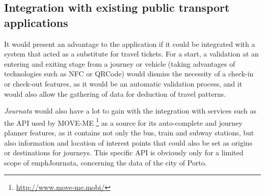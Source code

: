 \subsection{Integration with existing public transport applications}

It would present an advantage to the application if it could be integrated with a system that acted as a substitute for travel tickets. For a start, a validation at an entering and exiting stage from a journey or vehicle (taking advantages of technologies such as NFC or QRCode) would dismiss the necessity of a check-in or check-out features, as it would be an automatic validation process, and it would also allow the gathering of data for deduction of travel patterns.

\emph{Journata} would also have a lot to gain with the integration with services such as the API used by MOVE-ME \footnote{\url{http://www.move-me.mobi/}} as a source for its auto-complete and journey planner features, as it contains not only the bus, train and subway stations, but also information and location of interest points that could also be set as origins or destinations for journeys. This specific API is obviously only for a limited scope of emph{Journata}, concerning the data of the city of Porto. 




